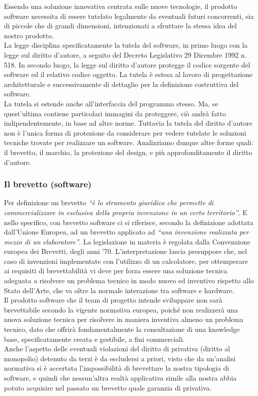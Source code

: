 Essendo una soluzione innovativa centrata sulle nuove tecnologie, il prodotto software necessita di essere tutelato legalmente da eventuali futuri concorrenti, sia di piccole che di grandi dimensioni, intenzionati a sfruttare la stessa idea del nostro prodotto.\\
La legge disciplina specificatamente la tutela del software, in primo luogo con la legge sul diritto d'autore, a seguito del Decreto Legislativo 29 Dicembre 1992 n. 518. In secondo luogo, la legge sul diritto d'autore protegge il codice sorgente del software ed il relativo codice oggetto. La tutela è estesa al lavoro di progettazione architetturale e successivamente di dettaglio per la definizione costruttiva del software.\\
La tutela si estende anche all'interfaccia del programma stesso. Ma, se quest'ultima contiene particolari immagini da proteggere, ciò andrà fatto indipendentemente, in base ad altre norme. Tuttavia la tutela del diritto d'autore non è l'unica forma di protezione da considerare per vedere tutelate le soluzioni tecniche trovate per realizzare un software. Analizziamo dunque altre forme quali: il brevetto, il marchio, la protezione del design, e più approfonditamente il diritto d'autore.

\subsubsection{Il brevetto (software)}
Per definizione un brevetto \textit{``è lo strumento giuridico che permette di commercializzare in esclusiva della propria invenzione in un certo territorio''}. E nello specifico, con brevetto software ci si riferisce, secondo la definizione adottata dall'Unione Europea, ad un brevetto applicato ad \textit{``una invenzione realizzata per mezzo di un elaboratore''}. La legislazione in materia è regolata dalla Convenzione europea dei Brevetti, degli anni '70. L'interpretazione lascia presuppore che, nel caso di invenzioni implementate con l'utilizzo di un calcolatore, per ottemperare ai requisiti di brevettabilità vi deve per forza essere una soluzione tecnica adeguata a risolvere un problema tecnico in modo nuovo ed inventivo rispetto allo Stato dell'Arte, che va oltre la normale interazione tra software e hardware.\\
Il prodotto software che il team di progetto intende sviluppare non sarà brevettabile secondo la vigente normativa europea, poiché non realizzerà una nuova soluzione tecnica per risolvere in maniera inventiva almeno un problema tecnico, dato che offrirà fondamentalmente la consultazione di una knowledge base, specificatamente creata e gestibile, a fini commerciali.\\
Anche l'aspetto delle eventuali violazioni del diritto di privativa (diritto al monopolio) detenuto da terzi è da escludersi a priori, visto che da un'analisi normativa si è accertata l'impossibilità di brevettare la nostra tipologia di software, e quindi che nessun'altra realtà applicativa simile alla nostra abbia potuto acquisire nel passato un brevetto quale garanzia di privativa.

